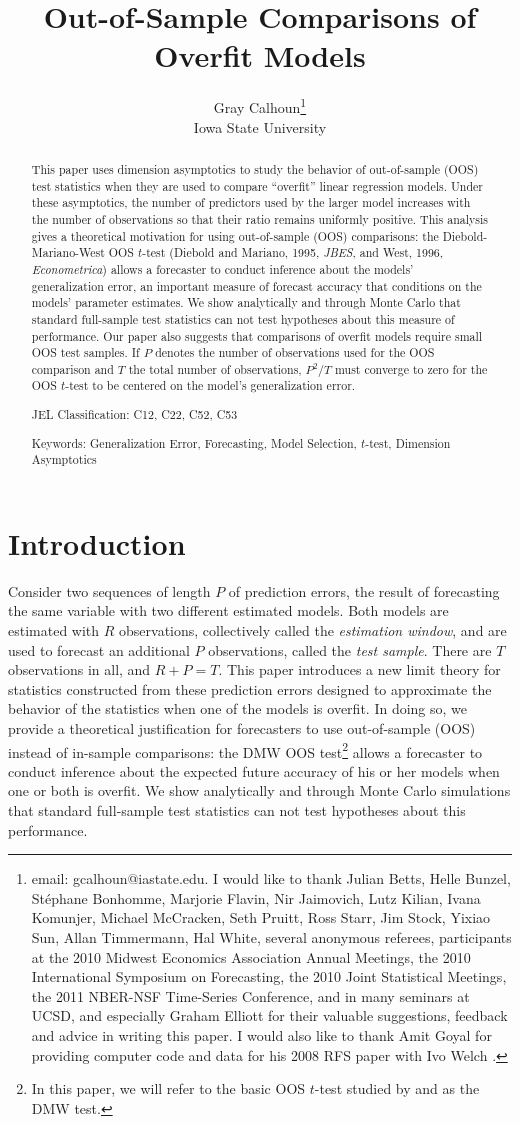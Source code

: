 \documentclass[12pt,draft]{article}
\title{Out-of-Sample Comparisons of Overfit Models}
\author{Gray Calhoun\thanks{email: gcalhoun@iastate.edu. I
    would like to thank Julian Betts, Helle Bunzel,
    St\'ephane Bonhomme, Marjorie Flavin,
    Nir Jaimovich, Lutz Kilian, Ivana Komunjer, Michael McCracken,
    Seth Pruitt, Ross Starr, Jim Stock, Yixiao Sun, Allan Timmermann,
    Hal White, several anonymous referees, participants at the 2010
    Midwest Economics Association Annual Meetings, the 2010
    International Symposium on Forecasting, the 2010 Joint Statistical
    Meetings, the 2011 NBER-NSF Time-Series
    Conference, and in many seminars at UCSD, and especially
    Graham Elliott for their valuable suggestions, feedback and advice
    in writing this paper.  I would also like to thank Amit Goyal for
    providing computer code and data for his 2008 RFS paper
    with Ivo Welch \citep{GoW:08}.} \\ Iowa State University}
\date{\VERSION}
\begin{document}
\maketitle

\begin{abstract}\noindent
  This paper uses dimension asymptotics to study the behavior of
  out-of-sample (OOS) test statistics when they are used to compare
  ``overfit'' linear regression models. Under these asymptotics, the
  number of predictors used by the larger model increases with the
  number of observations so that their ratio remains uniformly
  positive. This analysis gives a theoretical motivation for using
  out-of-sample (OOS) comparisons: the Diebold-Mariano-West OOS $t$-test
  (Diebold and Mariano, 1995, \textit{JBES}, and West, 1996,
  \textit{Econometrica}) allows a forecaster to conduct inference
  about the models' generalization error, an important measure of
  forecast accuracy that conditions on the models' parameter estimates.
  We show analytically and through Monte Carlo that standard full-sample
  test statistics can not test hypotheses about this measure of performance.
  Our paper also suggests that comparisons of overfit models require small
  OOS test samples. If $P$ denotes the number of observations used for the
  OOS comparison and $T$ the total number of observations, $P^2/T$ must
  converge to zero for the OOS $t$-test to be centered on the model's
  generalization error.

\noindent JEL Classification: C12, C22, C52, C53

\noindent Keywords: Generalization Error, Forecasting, Model
Selection, $t$-test, Dimension Asymptotics
\end{abstract}
\newpage

\section{Introduction}
\label{sec:introduction}

Consider two sequences of length $P$ of prediction errors, the result
of forecasting the same variable with two different estimated models.
Both models are estimated with $R$ observations, collectively called
the {\em estimation window}, and are used to forecast an additional
$P$ observations, called the {\em test sample}.  There are $T$
observations in all, and $R+P=T$.  This paper introduces a new limit
theory for statistics constructed from these prediction errors
designed to approximate the behavior of the statistics when one of the
models is overfit.  In doing so, we provide a theoretical
justification for forecasters to use out-of-sample (OOS) instead of in-sample
comparisons: the DMW OOS test\footnote{%
  In this paper, we will refer to the basic OOS $t$-test studied by
  \citet{DiM:95} and \citet{Wes:96} as the DMW test.} %
allows a forecaster to conduct
inference about the expected future accuracy of his or her models when
one or both is overfit.  We show analytically and through Monte Carlo simulations
that standard full-sample test statistics can not test hypotheses
about this performance.
\end{document}
